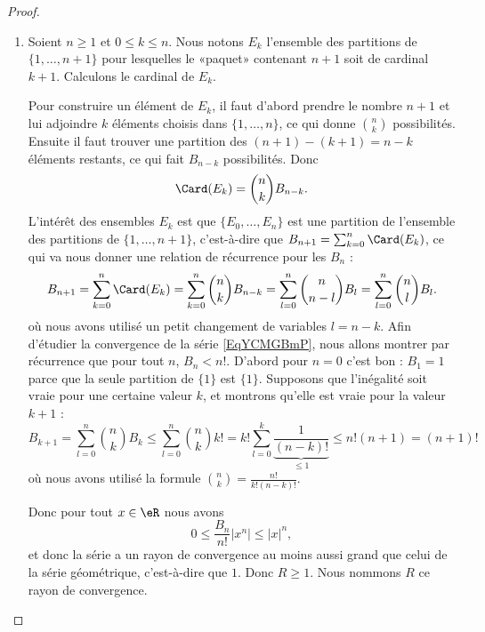 \begin{proof}
	\begin{enumerate}
		\item
		      Soient \( n\geq 1\) et \( 0\leq k\leq n\). Nous notons \( E_k\) l'ensemble des partitions de \( \{ 1,\ldots, n+1 \}\) pour lesquelles le «paquet» contenant \( n+1\) soit de cardinal \( k+1\). Calculons le cardinal de \( E_k\).

		      Pour construire un élément de \( E_k\), il faut d'abord prendre le nombre \( n+1\) et lui adjoindre \( k\) éléments choisis dans \( \{ 1,\ldots, n \}\), ce qui donne \( n\choose k\) possibilités. Ensuite il faut trouver une partition des \( (n+1)-(k+1)=n-k\) éléments restants, ce qui fait \( B_{n-k}\) possibilités. Donc
		      \begin{equation}
			      \Card(E_k)={n\choose k}B_{n-k}.
		      \end{equation}
		      L'intérêt des ensembles \( E_k\) est que \( \{ E_0,\ldots, E_n \}\) est une partition de l'ensemble des partitions de \( \{ 1,\ldots, n+1 \}\), c'est-à-dire que \( B_{n+1}=\sum_{k=0}^n\Card(E_k)\), ce qui va nous donner une relation de récurrence pour les \( B_n\) :
		      \begin{equation}
			      B_{n+1}=\sum_{k=0}^n\Card(E_k)
			      =\sum_{k=0}^n{n\choose k}B_{n-k}
			      =\sum_{l=0}^n{n\choose n-l}B_l
			      =\sum_{l=0}^n{n\choose l}B_l.
		      \end{equation}
		      où nous avons utilisé un petit changement de variables \( l=n-k\). Afin d'étudier la convergence de la série \eqref{EqYCMGBmP}, nous allons montrer par récurrence que pour tout \( n\), \( B_n<n!\). D'abord pour \( n=0\) c'est bon : \( B_1=1\) parce que la seule partition de \( \{ 1 \}\) est \( \{ 1 \}\). Supposons que l'inégalité soit vraie pour une certaine valeur \( k\), et montrons qu'elle est vraie pour la valeur \( k+1\) :
		      \begin{equation}
			      B_{k+1}=\sum_{l=0}^n{n\choose k}B_k
			      \leq \sum_{l=0}^n{n\choose k}k!
			      =k!\sum_{l=0}^k\underbrace{\frac{1}{ (n-k)! }}_{\leq 1}
			      \leq n!(n+1)
			      =(n+1)!
		      \end{equation}
		      où nous avons utilisé la formule \( {n\choose k}=\frac{ n! }{ k!(n-k)! }\).

		      Donc pour tout \( x\in \eR\) nous avons
		      \begin{equation}
			      0\leq \frac{ B_n }{ n! }| x^n |\leq | x |^n,
		      \end{equation}
		      et donc la série a un rayon de convergence au moins aussi grand que celui de la série géométrique, c'est-à-dire que \( 1\). Donc \( R\geq 1\). Nous nommons \( R\) ce rayon de convergence.


\end{enumerate}
\end{proof}
